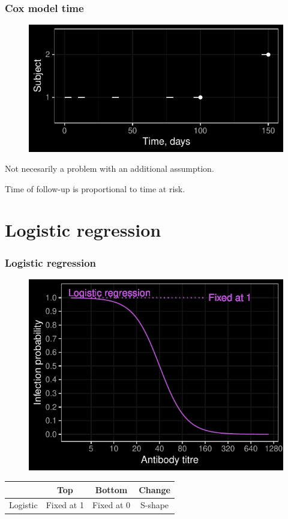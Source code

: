 \documentclass{beamer}
\begin{document}
\begin{frame}
\frametitle{Cox model time}
	
	\begin{figure}
		\includegraphics[scale = 0.75]{../curve-cox/timeplot_2_dark.pdf}%
	\end{figure}
	
	Not necesarily a problem with an additional assumption. \pause
	
	Time of follow-up is proportional to time at risk.
	
\end{frame}

\section{Logistic regression}

\begin{frame}
\frametitle{Logistic regression}

	\begin{figure}
		\includegraphics[scale = 0.75]{../curve-models/curve_2_dark.pdf}%
	\end{figure}

	\begin{table}
	\begin{tabular}{l | ccc}
		 & Top & Bottom & Change \\
		\hline
		Logistic & Fixed at 1 & Fixed at 0 & S-shape
	\end{tabular}
	\end{table}

\end{frame}
\end{document}

